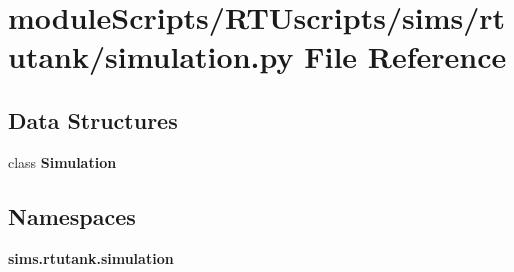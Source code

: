 \section{module\+Scripts/\+R\+T\+Uscripts/sims/rtutank/simulation.py File Reference}
\label{rtutank_2simulation_8py}
\subsection*{Data Structures}
\begin{DoxyCompactItemize}
\item 
class {\bf Simulation}
\end{DoxyCompactItemize}
\subsection*{Namespaces}
\begin{DoxyCompactItemize}
\item 
 {\bf sims.\+rtutank.\+simulation}
\end{DoxyCompactItemize}
